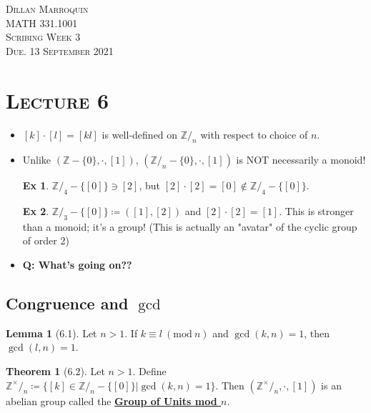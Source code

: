 \documentclass{article}
\newcommand{\Z}{\ensuremath{\mathbb{Z}}}
\newcommand{\Zn}[1]{\ensuremath{\mathbb{Z}/_#1}}
\newcommand{\Znx}[1]{\ensuremath{\mathbb{Z}^\times/_#1}}
\newcommand{\coleq}{\ensuremath{\coloneqq}}
\newcommand{\define}[1]{\textbf{\underline{#1}}}
\renewcommand{\mod}[1]{\ (\mathrm{mod}\ #1)}
\theoremstyle{definition}
\newtheorem*{thm}{Theorem}
\newtheorem*{ex}{Ex}
\newtheorem*{lem}{Lemma}
\theoremstyle{remark}
\begin{document}
    \begin{center}
        \textsc{Dillan Marroquin\\MATH 331.1001\\Scribing Week 3\\Due. 13 September 2021\\}
    \end{center}
        
    \noindent\section*{\textbf{\textsc{Lecture 6}}}{
        \begin{itemize}
            \item $[k]\cdot[l] = [kl]$ is well-defined on $\Zn{n}$ with respect to choice of $n$.
            \item Unlike $(\Z - \{0\},\cdot,[1])$, $(\Zn{n} - \{0\},\cdot,[1])$ is NOT necessarily a monoid!
            \begin{ex}
                $\Zn{4}-\{[0]\} \ni [2]$, but $[2]\cdot[2] = [0] \not \in \Zn{4}-\{[0]\}$.
            \end{ex}
            \begin{ex}
                $\Zn{3}- \{[0]\} \coleq ([1],[2])$ and $[2]\cdot[2] = [1]$. This is stronger than a monoid; it's a group! (This is actually an "avatar" of the cyclic group of order 2)
            \end{ex}
            \item \textbf{Q: What's going on??}
        \end{itemize}
        \subsection*{Congruence and $\gcd$}{
        
        \begin{lem}[6.1]
            Let $n>1$. If $k \equiv l\mod{n}$ and $\gcd(k,n)=1$, then $\gcd(l,n)=1$.
        \end{lem}
        
        \begin{thm}[6.2]
            Let $n>1$. Define $\Znx{n} \coleq \{[k] \in \Zn{n}-\{[0]\}|\gcd(k,n)=1\}$. Then $(\Znx{n}, \cdot, [1])$ is an abelian group called the \define{Group of Units mod $n$}.
        \end{thm}
        
}}
\end{document}
